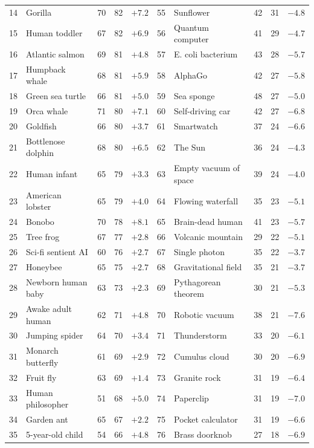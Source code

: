 \documentclass[10pt]{article}
\begin{document}
\begin{table}[t]
{\begin{tabular}{rlrrr|rlrrr}
14 & Gorilla & 70 & 82 & $+7.2$ & 55 & Sunflower & 42 & 31 & $-4.8$ \\
15 & Human toddler & 67 & 82 & $+6.9$ & 56 & Quantum computer & 41 & 29 & $-4.7$ \\
16 & Atlantic salmon & 69 & 81 & $+4.8$ & 57 & E. coli bacterium & 43 & 28 & $-5.7$ \\
17 & Humpback whale & 68 & 81 & $+5.9$ & 58 & AlphaGo & 42 & 27 & $-5.8$ \\
18 & Green sea turtle & 66 & 81 & $+5.0$ & 59 & Sea sponge & 48 & 27 & $-5.0$ \\
19 & Orca whale & 71 & 80 & $+7.1$ & 60 & Self-driving car & 42 & 27 & $-6.8$ \\
20 & Goldfish & 66 & 80 & $+3.7$ & 61 & Smartwatch & 37 & 24 & $-6.6$ \\
21 & Bottlenose dolphin & 68 & 80 & $+6.5$ & 62 & The Sun & 36 & 24 & $-4.3$ \\
22 & Human infant & 65 & 79 & $+3.3$ & 63 & Empty vacuum of space & 39 & 24 & $-4.0$ \\
23 & American lobster & 65 & 79 & $+4.0$ & 64 & Flowing waterfall & 35 & 23 & $-5.1$ \\
24 & Bonobo & 70 & 78 & $+8.1$ & 65 & Brain-dead human & 41 & 23 & $-5.7$ \\
25 & Tree frog & 67 & 77 & $+2.8$ & 66 & Volcanic mountain & 29 & 22 & $-5.1$ \\
26 & Sci-fi sentient AI & 60 & 76 & $+2.7$ & 67 & Single photon & 35 & 22 & $-3.7$ \\
27 & Honeybee & 65 & 75 & $+2.7$ & 68 & Gravitational field & 35 & 21 & $-3.7$ \\
28 & Newborn human baby & 63 & 73 & $+2.3$ & 69 & Pythagorean theorem & 30 & 21 & $-5.3$ \\
29 & Awake adult human & 62 & 71 & $+4.8$ & 70 & Robotic vacuum & 38 & 21 & $-7.6$ \\
30 & Jumping spider & 64 & 70 & $+3.4$ & 71 & Thunderstorm & 33 & 20 & $-6.1$ \\
31 & Monarch butterfly & 61 & 69 & $+2.9$ & 72 & Cumulus cloud & 30 & 20 & $-6.9$ \\
32 & Fruit fly & 63 & 69 & $+1.4$ & 73 & Granite rock & 31 & 19 & $-6.4$ \\
33 & Human philosopher & 51 & 68 & $+5.0$ & 74 & Paperclip & 31 & 19 & $-7.0$ \\
34 & Garden ant & 65 & 67 & $+2.2$ & 75 & Pocket calculator & 31 & 19 & $-6.6$ \\
35 & 5-year-old child & 54 & 66 & $+4.8$ & 76 & Brass doorknob & 27 & 18 & $-6.9$ \\

\end{tabular}}
\end{table}
\end{document}
